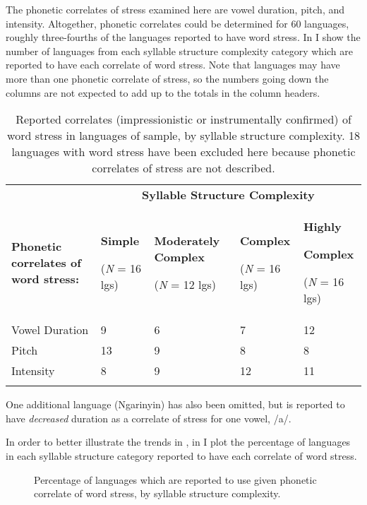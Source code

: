   The phonetic correlates of stress examined here are vowel duration, pitch, and intensity. Altogether, phonetic correlates could be determined for 60 languages, roughly three-fourths of the languages reported to have word stress. In  I show the number of languages from each syllable structure complexity category which are reported to have each correlate of word stress. Note that languages may have more than one phonetic correlate of stress, so the numbers going down the columns are not expected to add up to the totals in the column headers.

\begin{table}
\begin{tabularx}{\textwidth}{XXXXX}
\lsptoprule
 & \multicolumn{4}{c}{ \textbf{Syllable Structure Complexity}}\\
 \textbf{Phonetic correlates of word stress:} & { \textbf{Simple}}

 (\textit{N} = 16 lgs) & { \textbf{Moderately Complex}}

 (\textit{N} = 12 lgs) & { \textbf{Complex}}

 (\textit{N} = 16 lgs) & { \textbf{Highly} }

{ \textbf{Complex}}

 (\textit{N} = 16 lgs)\\
 Vowel Duration & 9 & 6 & 7 & 12\\
 Pitch & 13 & 9 & 8 & 8\\
 Intensity & 8 & 9 & 12 & 11\\
\lspbottomrule
\end{tabularx}
\caption{\label{tab:5.13}Reported correlates (impressionistic or instrumentally confirmed) of word stress in languages of sample, by syllable structure complexity. 18 languages with word stress have been excluded here because phonetic correlates of stress are not described.}One additional language (Ngarinyin) has also been omitted, but is reported to have \textit{decreased} duration as a correlate of stress for one vowel, /a/.
\end{table}

  In order to better illustrate the trends in , in  I plot the percentage of languages in each syllable structure category reported to have each correlate of word stress.

\begin{figure}
\caption{\label{fig:5.4} Percentage of languages which are reported to use given phonetic correlate of word stress, by syllable structure complexity.}
\end{figure}

